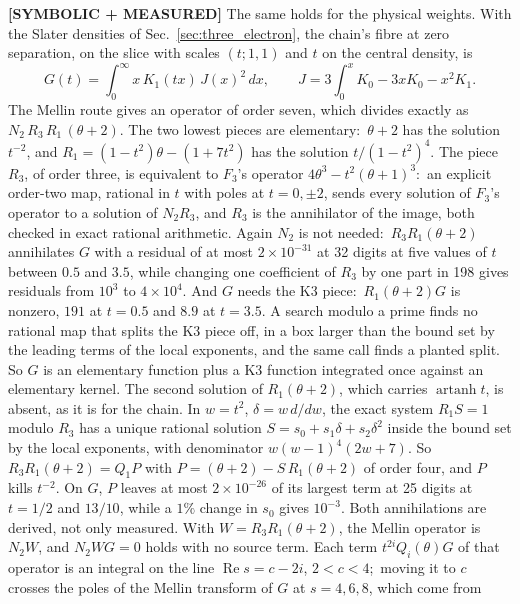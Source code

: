 \documentclass[aps,pra,twocolumn,superscriptaddress,longbibliography]{revtex4-2}
\begin{document}
\textbf{[SYMBOLIC + MEASURED]} The same holds for the physical weights.
With the Slater densities of Sec.~\ref{sec:three_electron}, the chain's
fibre at zero separation, on the slice with scales $(t;1,1)$ and $t$ on
the central density, is
\begin{equation}
  G(t)=\int_0^\infty x\,K_1(tx)\,J(x)^2\,dx,\qquad
  J=3\int_0^x K_0-3xK_0-x^2K_1 .
  \label{eq:chain_slater_slice}
\end{equation}
The Mellin route gives an operator of order seven, which divides exactly
as $N_2\,R_3\,R_1\,(\theta+2)$.  The two lowest pieces are elementary:\
$\theta+2$ has the solution $t^{-2}$, and $R_1=(1-t^2)\theta-(1+7t^2)$ has
the solution $t/(1-t^2)^4$.  The piece $R_3$, of order three, is
equivalent to $F_3$'s operator $4\theta^3-t^2(\theta+1)^3$:\ an explicit
order-two map, rational in $t$ with poles at $t=0,\pm2$, sends every
solution of $F_3$'s operator to a solution of $N_2R_3$, and $R_3$ is the
annihilator of the image, both checked in exact rational arithmetic.
Again $N_2$ is not needed:\ $R_3R_1(\theta+2)$ annihilates $G$ with a
residual of at most $2\times10^{-31}$ at 32 digits at five values of $t$
between $0.5$ and $3.5$, while changing one coefficient of $R_3$ by one part
in 198 gives residuals from $10^3$ to $4\times10^4$.  And $G$ needs the K3
piece:\ $R_1(\theta+2)G$ is nonzero, $191$ at $t=0.5$ and $8.9$ at $t=3.5$.
A search modulo a prime finds no rational map that splits the K3 piece
off, in a box larger than the bound set by the leading terms of the local
exponents, and the same call finds a planted split.  So $G$ is an
elementary function plus a K3 function integrated once against an
elementary kernel.  The second solution of $R_1(\theta+2)$, which carries
$\operatorname{artanh}t$, is absent, as it is for the chain.  In
$w=t^2$, $\delta=w\,d/dw$, the exact system $R_1S=1$ modulo $R_3$ has a
unique rational solution $S=s_0+s_1\delta+s_2\delta^2$ inside the bound
set by the local exponents, with denominator $w(w-1)^4(2w+7)$.  So
$R_3R_1(\theta+2)=Q_1P$ with $P=(\theta+2)-S\,R_1(\theta+2)$ of order four,
and $P$ kills $t^{-2}$.  On $G$, $P$ leaves at most $2\times10^{-26}$ of its
largest term at 25 digits at $t=1/2$ and $13/10$, while a $1\%$ change in
$s_0$ gives $10^{-3}$.  Both annihilations are derived, not only measured.
With $W=R_3R_1(\theta+2)$, the Mellin operator is $N_2W$, and $N_2WG=0$ holds
with no source term.  Each term $t^{2i}Q_i(\theta)G$ of that operator is an
integral on the line $\operatorname{Re}s=c-2i$, $2<c<4$;\ moving it to $c$
crosses the poles of the Mellin transform of $G$ at $s=4,6,8$, which come from
\end{document}
